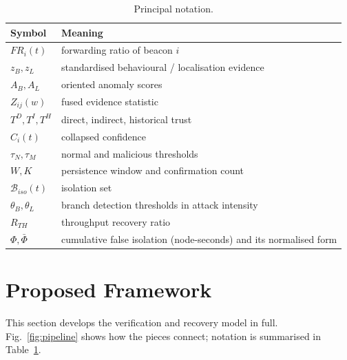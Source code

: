 \documentclass[pdflatex,sn-mathphys-num]{sn-jnl}%
\theoremstyle{thmstyleone}%
\theoremstyle{thmstyletwo}%
\theoremstyle{thmstylethree}%
\begin{document}
\begin{table}[!t]
\caption{Principal notation.}
\label{tab:notation}
\centering
\footnotesize
\begin{tabular}{@{}ll@{}}
\toprule
Symbol & Meaning \\
\midrule
$FR_i(t)$ & forwarding ratio of beacon $i$ \\
$z_B, z_L$ & standardised behavioural / localisation evidence \\
$A_B, A_L$ & oriented anomaly scores \\
$Z_{ij}(w)$ & fused evidence statistic \\
$T^D, T^I, T^H$ & direct, indirect, historical trust \\
$\hat C_i(t)$ & collapsed confidence \\
$\tau_N, \tau_M$ & normal and malicious thresholds \\
$W, K$ & persistence window and confirmation count \\
$\mathcal{B}_{iso}(t)$ & isolation set \\
$\theta_B, \theta_L$ & branch detection thresholds in attack intensity \\
$R_{TH}$ & throughput recovery ratio \\
$\Phi, \bar\Phi$ & cumulative false isolation (node-seconds) and its normalised form \\
\bottomrule
\end{tabular}
\end{table}

\section{Proposed Framework}
\label{sec:framework}

This section develops the verification and recovery model in full.
Fig.~\ref{fig:pipeline} shows how the pieces connect; notation is summarised
in Table~\ref{tab:notation}.
\end{document}
